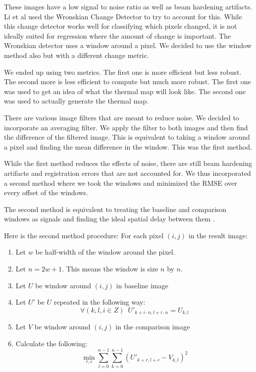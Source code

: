 \documentclass[]{spie}  %
\begin{document}
These images have a low signal to noise ratio as well as beam hardening artifacts. Li et al used the Wronskian Change Detector to try to account for this. While this change detector works well for classifying which pixels changed, it is not ideally suited for regression where the amount of change is important. The Wronskian detector uses a window around a pixel. We decided to use the window method also but with a different change metric. 

We ended up using two metrics. The first one is more efficient but less robust. The second more is less efficient to compute but much more robust. The first one was used to get an idea of what the thermal map will look like. The second one was used to actually generate the thermal map. 

There are various image filters that are meant to reduce noise. We decided to incorporate an averaging filter. We apply the filter to both images and then find the difference of the filtered image. This is equivalent to taking a window around a pixel and finding the mean difference in the window. This was the first method. 

While the first method reduces the effects of noise, there are still beam hardening artifacts and registration errors that are not accounted for. We thus incorporated a second method where we took the windows and minimized the RMSE over every offset of the windows. 

The second method is equivalent to treating the baseline and comparison windows as signals and finding the ideal spatial delay between them \cite{Rhudy09}. 

Here is the second method procedure:
For each pixel $(i,j)$ in the result image:
\begin{enumerate}
\item Let $w$ be half-width of the window around the pixel. 
\item Let $n=2w+1$. This means the window is size $n$ by $n$. 
\item Let $U$ be window around $(i,j)$ in baseline image
\item Let $U'$ be $U$ repeated in the following way:
\[
\forall(k,l,i \in Z)\, \, \, U'_{k+i \cdot n,l+i \cdot n} = U_{k,l}
\]
\item Let $V$ be window around $(i,j)$ in the comparison image
\item Calculate the following:
\[
\min_{r,c} \sum_{l=0}^{n-1} \sum_{k=0}^{n-1} {(U'_{k+r,l+c}-V_{k,l})^2}
\]

\end{enumerate}
\end{document}
